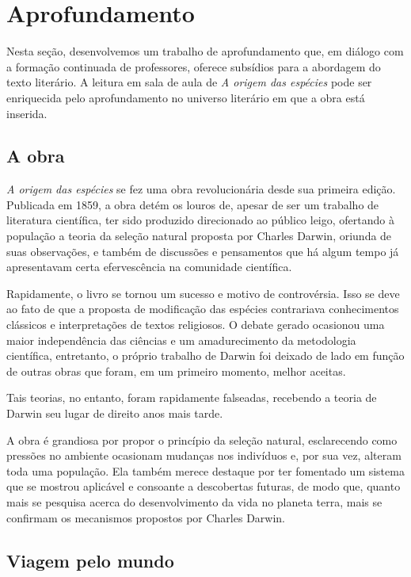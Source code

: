 \documentclass[11pt]{extarticle}
\begin{document}
\section{Aprofundamento}

Nesta seção, desenvolvemos um trabalho de aprofundamento que, em diálogo com
a formação continuada de professores, oferece subsídios para a abordagem do
texto literário. A leitura em sala de aula de \emph{A origem das espécies} pode
ser enriquecida pelo aprofundamento no universo literário em que a obra está
inserida.

\subsection{A obra}

\emph{A origem das espécies} se fez uma obra revolucionária desde sua primeira edição.
Publicada em 1859, a obra detém os louros de, apesar de ser um
trabalho de literatura científica, ter sido produzido direcionado ao público
leigo, ofertando à população a teoria da seleção natural proposta por Charles
Darwin, oriunda de suas observações, e também de discussões e pensamentos que
há algum tempo já apresentavam certa efervescência na comunidade científica.

Rapidamente, o livro se tornou um sucesso e motivo de controvérsia. Isso se
deve ao fato de que a proposta de modificação das espécies contrariava
conhecimentos clássicos e interpretações de textos religiosos. O debate gerado
ocasionou uma maior independência das ciências e um amadurecimento da
metodologia científica, entretanto, o próprio trabalho de Darwin foi deixado de
lado em função de outras obras que foram, em um primeiro momento, melhor
aceitas.

Tais teorias, no entanto, foram rapidamente falseadas, recebendo a teoria de
Darwin seu lugar de direito anos mais tarde.

A obra é grandiosa por propor o princípio da seleção natural, esclarecendo como
pressões no ambiente ocasionam mudanças nos indivíduos e, por sua vez, alteram
toda uma população. Ela também merece destaque por ter fomentado um sistema que
se mostrou aplicável e consoante a descobertas futuras, de modo que, quanto
mais se pesquisa acerca do desenvolvimento da vida no planeta terra, mais se
confirmam os mecanismos propostos por Charles Darwin.


\subsection{Viagem pelo mundo}
\end{document}

